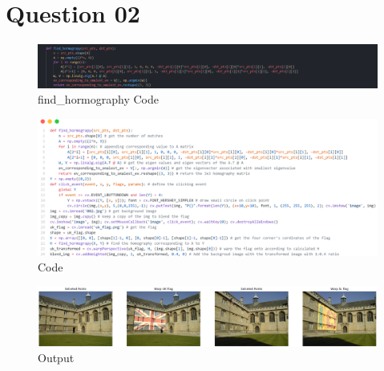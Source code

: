 \documentclass[a4paper]{article}
\begin{document}
\section*{Question 02}
\begin{figure}[!htb]
  \centering
  \includegraphics[width=\textwidth]{images/find_hormo.png}
  \caption{find\_hormography Code}
  \label{find_hormography}
\end{figure}

\begin{figure}[!htb]
  \centering
  \includegraphics[width=\textwidth]{images/q2code.png}
  \caption{Code}
  \label{q2code}
\end{figure}

\begin{figure}[!htb]
  \centering
  \includegraphics[width=\textwidth]{images/q22.png}
  \caption{Output}
  \label{q2}
\end{figure}
\end{document}
